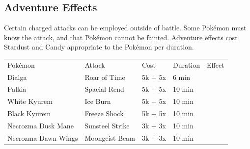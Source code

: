 \subsection{Adventure Effects}
\label{sec:effects}
Certain charged attacks can be employed outside of battle.
Some Pokémon must know the attack, and that Pokémon cannot be fainted.
Adventure effects cost Stardust and Candy appropriate to the Pokémon
  per duration.
\begin{table}[ht]
  \centering
  \begin{tabular}{lllll}
    Pokémon & Attack & Cost & Duration & Effect\\
    \Midrule
    Dialga & Roar of Time & 5k + 5x & 6 min & \\
    Palkia & Spacial Rend & 5k + 5x & 10 min & \\
    White Kyurem & Ice Burn & 5k + 5x & 10 min & \\
    Black Kyurem & Freeze Shock & 5k + 5x & 10 min & \\
    Necrozma Dusk Mane & Sunsteel Strike & 3k + 3x & 10 min & \\
    Necrozma Dawn Wings & Moongeist Beam & 3k + 3x & 10 min & \\
  \end{tabular}
\end{table}

